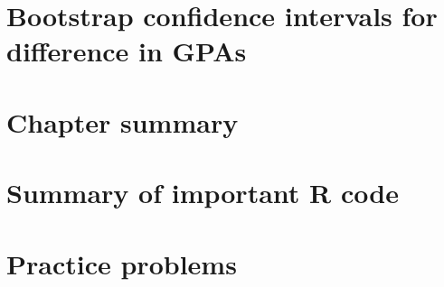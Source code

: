 \documentclass[]{book}
\begin{document}
\section{Bootstrap confidence intervals for difference in
GPAs}\label{section_2-9}

\section{Chapter summary}\label{section_2-10}

\section{Summary of important R code}\label{section_2-11}

\section{Practice problems}\label{section_2-12}


\end{document}
